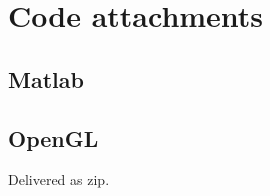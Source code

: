 \section{Code attachments}
\subsection{Matlab}









\subsection{OpenGL}
Delivered as zip.






